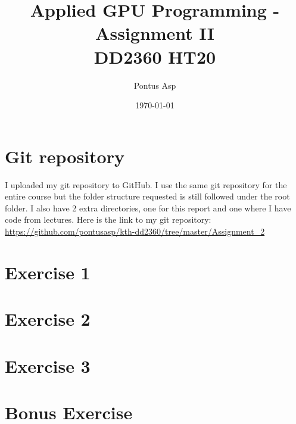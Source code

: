 \documentclass[a4paper, 12pt]{article}
\begin{document}
\title{\vspace{4.0cm}Applied GPU Programming - Assignment II\\
\large DD2360 HT20}
\author{Pontus Asp}
\date{\today}
\maketitle
\thispagestyle{empty}
\newpage

\clearpage
{}

\section{Git repository}
I uploaded my git repository to GitHub. I use the same git repository for the entire course but the folder structure requested is still followed under the root folder. I also have 2 extra directories, one for this report and one where I have code from lectures.
\newline\newline
Here is the link to my git repository:\newline
\url{https://github.com/pontusasp/kth-dd2360/tree/master/Assignment_2}



\section{Exercise 1}




\section{Exercise 2}




\section{Exercise 3}




\section{Bonus Exercise}




\end{document}
